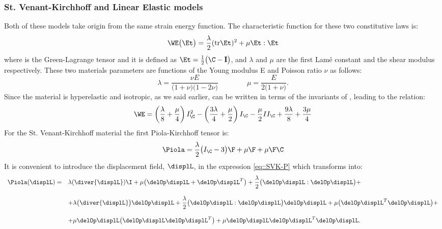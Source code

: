 \subsubsection{St. Venant-Kirchhoff and Linear Elastic models}
Both of these models take origin from the same strain energy function. The characteristic function \W for these two constitutive laws is:
\begin{equation}
  \WE\big(\Et\big)=\frac{\lambda}{2}(\text{tr}\Et)^2 + \mu\Et:\Et
\label{eq::W-SVKLE}
\end{equation}
where \Et is the Green-Lagrange tensor and it is defined as $\Et=\frac{1}{2}\big(\C-\textbf{I}\big)$, and $\lambda$ and $\mu$ are the first Lam\'e constant and the shear modulus respectively. These two materials parameters are functions of the Young modulus E and Poisson ratio $\nu$ as follows:
\begin{equation}
  \lambda=\frac{\nu E}{\big(1+\nu \big)\big(1-2\nu \big)}\qquad\qquad \mu=\frac{E}{2\big(1+\nu\big)}.
  \label{eq::LameConst}
\end{equation}
Since the material is hyperelastic and isotropic, as we said earlier, \W can be written in terms of the invariants of \C, leading to the relation:
\begin{equation}
  \WE=\left(\frac{\lambda}{8}+\frac{\mu}{4}\right)I_{\C}^2 - \left(\frac{3\lambda}{4}+\frac{\mu}{2}\right)I_{\C} - \frac{\mu}{2}II_{\C}+\frac{9\lambda}{8}+\frac{3\mu}{4}
\label{eq::WSVK-Inv}
\end{equation}
For the St. Venant-Kirchhoff material the first Piola-Kirchhoff tensor is:
\begin{equation}
  \Piola = \frac{\lambda}{2}\big(I_{\C}-3\big)\F + \mu\F +\mu\F\C
  \label{eq::SVK-P}
\end{equation}
It is convenient to introduce the displacement field, $\displL$, in the expression \eqref{eq::SVK-P} which transforms into:
\begin{equation}
  \begin{array}{llll}
    \Piola(\displL) = & \displaystyle \lambda(\diver{\displL})\I + \mu\big(\delOp\displL + \delOp\displL^T\big)  +\frac{\lambda}{2}\big(\delOp\displL:\delOp\displL\big)+ \\
    \\
    & \displaystyle + \lambda\big(\diver{\displL}\big)\delOp\displL + \frac{\lambda}{2}\big(\delOp\displL:\delOp\displL\big)\delOp\displL + \mu\big(\delOp\displL^T \delOp\displL\big)+\\
    \\
    & \displaystyle + \mu\delOp\displL\big(\delOp\displL\delOp\displL^T\big) + \mu\delOp\displL\delOp\displL^T\delOp\displL.
  \end{array}
  \label{eq::SVK-P-displ}
\end{equation}
